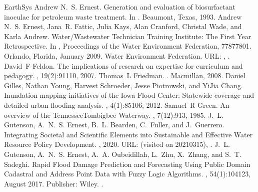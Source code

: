 \documentclass[letterpaper,12pt,english,openany,oneside]{sphinxmanual}
\begin{document}
\begin{sphinxthebibliography}{EarthSys}
\sphinxAtStartPar
Andrew N. S. Ernest. Generation and evaluation of biosurfactant inoculae for petroleum waste treatment. In . Beaumont, Texas, 1993.
\sphinxAtStartPar
Andrew N. S. Ernest, Jana R. Fattic, Julia Kays, Alan Cranford, Christal Wade, and Karla Andrew. Water/Wastewater Technician Training Institute: The First Year Retrospective. In , Proceedings of the Water Environment Federation, 7787\textendash{}7801. Orlando, Florida, January 2009. Water Environment Federation. URL: , .
\sphinxAtStartPar
David F Feldon. The implications of research on expertise for curriculum and pedagogy. , 19(2):91\textendash{}110, 2007.
\sphinxAtStartPar
Thomas L Friedman. . Macmillan, 2008.
\sphinxAtStartPar
Daniel Gilles, Nathan Young, Harvest Schroeder, Jesse Piotrowski, and Yi\sphinxhyphen{}Jia Chang. Inundation mapping initiatives of the Iowa Flood Center: Statewide coverage and detailed urban flooding analysis. , 4(1):85\textendash{}106, 2012.
\sphinxAtStartPar
Samuel R Green. An overview of the Tennessee\sphinxhyphen{}Tombigbee Waterway. , 7(1\sphinxhyphen{}2):9\textendash{}13, 1985.
\sphinxAtStartPar
J. L. Gutenson, A. N. S. Ernest, B. L. Bearden, C. Fuller, and J. Guerrero. Integrating Societal and Scientific Elements into Sustainable and Effective Water Resource Policy Development. , 2020. URL:  (visited on 2021\sphinxhyphen{}03\sphinxhyphen{}15), .
\sphinxAtStartPar
J. L. Gutenson, A. N. S. Ernest, A. A. Oubeidillah, L. Zhu, X. Zhang, and S. T. Sadeghi. Rapid Flood Damage Prediction and Forecasting Using Public Domain Cadastral and Address Point Data with Fuzzy Logic Algorithms. , 54(1):104\textendash{}123, August 2017. Publisher: Wiley. .

\end{sphinxthebibliography}
\end{document}
